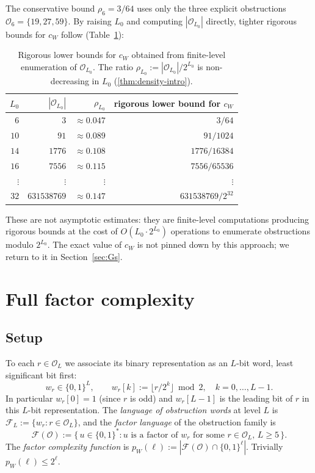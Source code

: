 \documentclass[11pt,reqno]{amsart}
\newcommand{\Obs}{\mathcal{O}}
\newcommand{\Fac}{\mathcal{F}}
\begin{document}
The conservative bound $\rho_6 = 3/64$ uses only the three explicit
obstructions $\Obs_6 = \{19, 27, 59\}$. By raising $L_0$ and computing
$|\Obs_{L_0}|$ directly, tighter rigorous bounds for $c_W$ follow
(Table~\ref{tab:density-bounds}):

\begin{table}[ht]
\centering
\begin{tabular}{rrrr}
\toprule
$L_0$ & $|\Obs_{L_0}|$ & $\rho_{L_0}$ & rigorous lower bound for $c_W$ \\
\midrule
$6$  & $3$    & $\approx 0.047$ & $3/64$ \\
$10$ & $91$   & $\approx 0.089$ & $91/1024$ \\
$14$ & $1776$ & $\approx 0.108$ & $1776/16384$ \\
$16$ & $7556$ & $\approx 0.115$ & $7556/65536$ \\
$\vdots$ & $\vdots$ & $\vdots$ & $\vdots$ \\
$32$ & $631538769$ & $\approx 0.147$ & $631538769/2^{32}$ \\
\bottomrule
\end{tabular}
\caption{Rigorous lower bounds for $c_W$ obtained from finite-level enumeration of $\Obs_{L_0}$. The ratio $\rho_{L_0} := |\Obs_{L_0}|/2^{L_0}$ is non-decreasing in $L_0$ (\cref{thm:density-intro}).}
\label{tab:density-bounds}
\end{table}

These are not asymptotic estimates: they are finite-level computations
producing rigorous bounds at the cost of $O(L_0 \cdot 2^{L_0})$ operations
to enumerate obstructions modulo $2^{L_0}$. The exact value of $c_W$ is
not pinned down by this approach; we return to it in
Section~\ref{sec:Gs}.

\section{Full factor complexity}
\label{sec:fc}

\subsection{Setup}

To each $r \in \Obs_L$ we associate its binary representation as an
$L$-bit word, least significant bit first:
\[
w_r \in \{0,1\}^L, \qquad w_r[k] := \lfloor r / 2^k \rfloor \bmod 2, \quad k = 0, \ldots, L-1.
\]
In particular $w_r[0] = 1$ (since $r$ is odd) and $w_r[L-1]$ is the
leading bit of $r$ in this $L$-bit representation.
The \emph{language of obstruction words} at level $L$ is
$\Fac_L := \{w_r : r \in \Obs_L\}$, and the \emph{factor language} of the
obstruction family is
\[
\Fac(\Obs) := \{\, u \in \{0,1\}^* : u \text{ is a factor of } w_r \text{ for some } r \in \Obs_L,\, L \ge 5 \,\}.
\]
The \emph{factor complexity function} is
$p_W(\ell) := |\Fac(\Obs) \cap \{0,1\}^\ell|$. Trivially $p_W(\ell) \le 2^\ell$.
\end{document}
